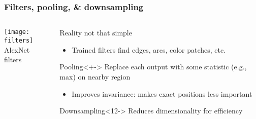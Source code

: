 \begin{frame}
    \frametitle{Filters, pooling, \& downsampling}

    \begin{columns}
        \begin{column}{0.4\textwidth}
            \centering
            \texttt{[image: filters]} \\
            {\footnotesize AlexNet filters \citep{KrizhevskyNIPS12}}
            \vspace{5mm}

            
        \end{column}

        \begin{column}{0.6\textwidth}
            Reality not that simple
            \begin{itemize}
                \item Trained filters find edges, arcs, color patches, etc.
            \end{itemize}

            \setcounter{beamerpauses}{2}

            \begin{block}{Pooling}<+->
                Replace each output with some statistic (e.g., max) on nearby region
            \end{block}

            \begin{itemize}[<.->]
                \item Improves invariance: makes exact positions less important
            \end{itemize}

            \begin{block}{Downsampling}<12->
                Reduces dimensionality for efficiency
            \end{block}
        \end{column}
    \end{columns}
\end{frame}

